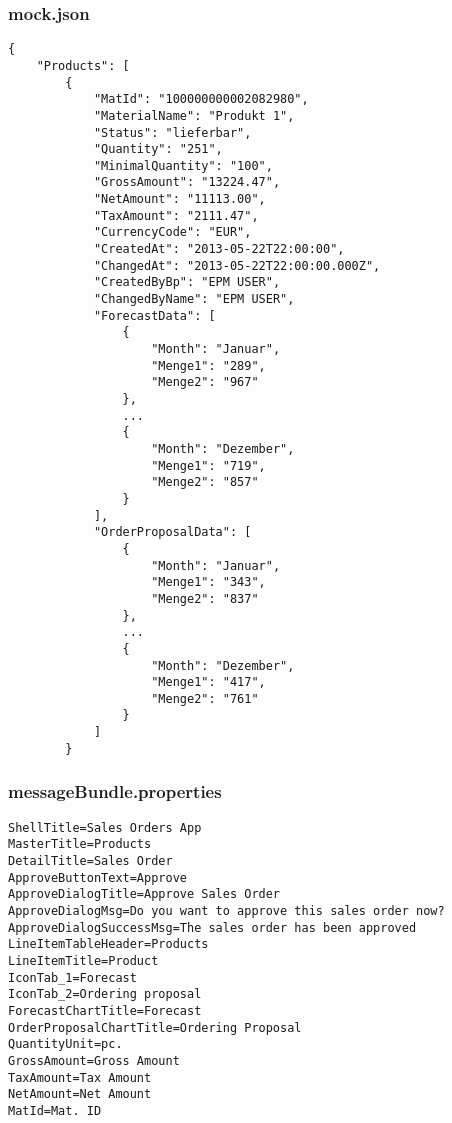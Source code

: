 \newpage
\subsubsection*{mock.json}
\begin{lstlisting}[frame=htrbl, label=lst:mock.json]
{
    "Products": [
        {
            "MatId": "100000000002082980",
            "MaterialName": "Produkt 1",
            "Status": "lieferbar",
            "Quantity": "251",
            "MinimalQuantity": "100",
            "GrossAmount": "13224.47",
            "NetAmount": "11113.00",
            "TaxAmount": "2111.47",
            "CurrencyCode": "EUR",
            "CreatedAt": "2013-05-22T22:00:00",
            "ChangedAt": "2013-05-22T22:00:00.000Z",
            "CreatedByBp": "EPM USER",
            "ChangedByName": "EPM USER",
            "ForecastData": [
                {
                    "Month": "Januar",
                    "Menge1": "289",
                    "Menge2": "967"
                },
                ...
                {
                    "Month": "Dezember",
                    "Menge1": "719",
                    "Menge2": "857"
                }
            ],
            "OrderProposalData": [
                {
                    "Month": "Januar",
                    "Menge1": "343",
                    "Menge2": "837"
                },
                ...
                {
                    "Month": "Dezember",
                    "Menge1": "417",
                    "Menge2": "761"
                }
            ]
        }
\end{lstlisting}

\newpage
\subsubsection*{messageBundle.properties}
\begin{lstlisting}[frame=htrbl, label=lst:messageBundle.properties]
ShellTitle=Sales Orders App
MasterTitle=Products
DetailTitle=Sales Order
ApproveButtonText=Approve
ApproveDialogTitle=Approve Sales Order
ApproveDialogMsg=Do you want to approve this sales order now?
ApproveDialogSuccessMsg=The sales order has been approved
LineItemTableHeader=Products
LineItemTitle=Product
IconTab_1=Forecast
IconTab_2=Ordering proposal
ForecastChartTitle=Forecast
OrderProposalChartTitle=Ordering Proposal
QuantityUnit=pc.
GrossAmount=Gross Amount
TaxAmount=Tax Amount
NetAmount=Net Amount
MatId=Mat. ID
\end{lstlisting}

